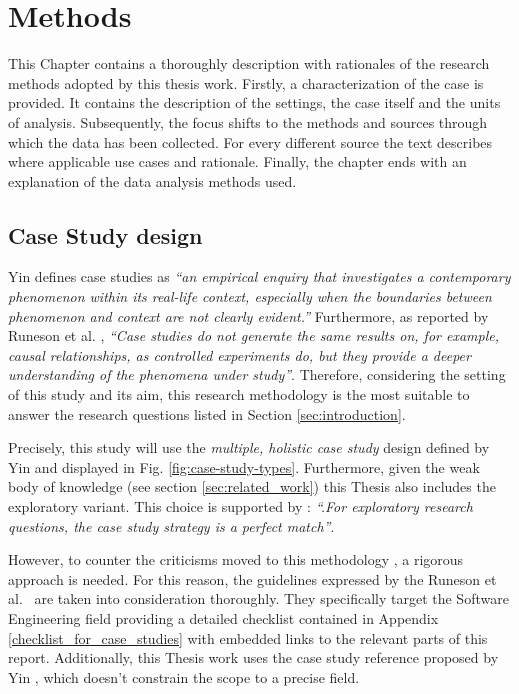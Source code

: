 \chapter{Methods} \label{methods}
This Chapter contains a thoroughly description with rationales of the research methods adopted by this thesis work. Firstly, a characterization of the case is provided. It contains the description of the settings, the case itself and the units of analysis. Subsequently, the focus shifts to the methods and sources through which the data has been collected. For every different source the text describes where applicable use cases and rationale. Finally, the chapter ends with an explanation of the data analysis methods used.


%
%
%
%
\section{Case Study design}	\label{sec:case-description}
Yin \cite{case_study_guide} defines case studies as \textit{``an empirical enquiry that investigates a contemporary phenomenon within its real-life context, especially when the boundaries between phenomenon and context are not clearly evident.''}
Furthermore, as reported by Runeson et al. \cite[p.~3]{case_study_software_engineering}, \textit{``Case studies do not generate the same results on, for example, causal relationships, as controlled experiments do, but they provide a deeper understanding of the phenomena under study''}. Therefore, considering the setting of this study and its aim, this research methodology is the most suitable to answer the research questions listed in Section \ref{sec:introduction}.

Precisely, this study will use the \textit{multiple, holistic case study} design defined by Yin \cite{case_study_guide} and displayed in Fig. \ref{fig:case-study-types}. Furthermore, given the weak body of knowledge (see section \ref{sec:related_work}) this Thesis also includes the exploratory variant. This choice is supported by \cite[p.~19]{case_study_software_engineering}: \textit{``.For exploratory research questions, the case study strategy is a perfect match''}.

However, to counter the criticisms moved to this methodology \cite[p.~4]{case_study_software_engineering}, a rigorous approach is needed. For this reason, the guidelines expressed by the Runeson et al.\ \cite{case_study_software_engineering} are taken into consideration thoroughly. They specifically target the Software Engineering field providing a detailed checklist contained in Appendix \ref{checklist_for_case_studies} with embedded links to the relevant parts of this report. Additionally, this Thesis work uses the case study reference proposed by Yin \cite{case_study_guide}, which doesn't constrain the scope to a precise field.


